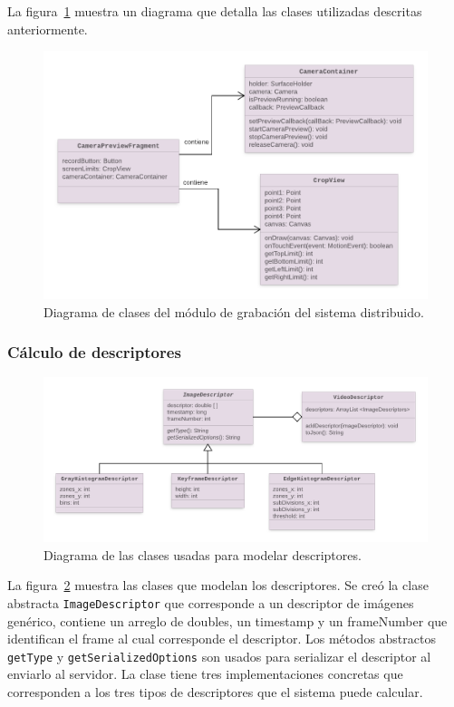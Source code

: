 La figura~\ref{diagrama_modulo_captura} muestra un diagrama que detalla las clases utilizadas descritas anteriormente.

	\begin{figure}[!h]
		\centering
		\includegraphics[scale=1.6]{imagenes/cap4/diagrama_modulo_captura.png}
		\caption{Diagrama de clases del módulo de grabación del sistema distribuido.}
		\label{diagrama_modulo_captura}
	\end{figure}

\subsubsection*{Cálculo de descriptores}
	\begin{figure}[!h]
		\centering
		\includegraphics[scale=1.6]{imagenes/cap4/diagrama_clases_descriptores.png}
		\caption{Diagrama de las clases usadas para modelar descriptores.}
		\label{diagrama_clases_descriptores}
	\end{figure}
La figura~\ref{diagrama_clases_descriptores} muestra las clases que modelan los descriptores. Se creó la clase abstracta \texttt{ImageDescriptor} que corresponde a un descriptor de imágenes genérico, contiene un arreglo de doubles, un timestamp y un frameNumber que identifican el frame al cual corresponde el descriptor. Los métodos abstractos \texttt{getType} y \texttt{getSerializedOptions} son usados para serializar el descriptor al enviarlo al servidor. La clase tiene tres implementaciones concretas que corresponden a los tres tipos de descriptores que el sistema puede calcular.

